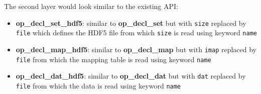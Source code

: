 \documentclass[11pt]{article}
\begin{document}
The second layer would look similar to the existing API:
\begin{itemize}
\item {\bf op\_decl\_set\_hdf5}: similar to {\bf op\_decl\_set} but with {\tt size} 
replaced by {\tt file} which defines the HDF5 file from which {\tt size} 
is read using keyword {\tt name}

\item {\bf op\_decl\_map\_hdf5}: similar to {\bf op\_decl\_map} but with {\tt imap} 
replaced by {\tt file} from which the mapping table is read using keyword {\tt name}

\item {\bf op\_decl\_dat\_hdf5}: similar to {\bf op\_decl\_dat} but with {\tt dat} 
replaced by {\tt file} from which the data is read using keyword {\tt name}
\end{itemize}
\end{document}
